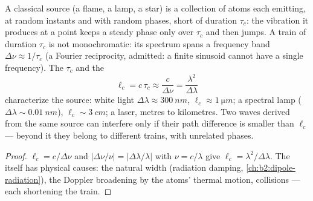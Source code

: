 \begin{proposition}\label{prop:b2:scalar-light-model:coherence}
A classical source (a flame, a lamp, a star) is a collection of atoms
each emitting, at random instants and with random phases, short
\emph{} of duration $\tau_c$: the vibration it produces at a
point keeps a steady phase only over $\tau_c$ and then jumps. A train of
duration $\tau_c$ is not monochromatic: its spectrum spans a frequency
band $\Delta\nu \approx 1/\tau_c$ (a Fourier reciprocity, admitted: a finite
sinusoid cannot have a single frequency). The \emph{}
$\tau_c$ and the \emph{}
\[
\ell_c = c\,\tau_c \approx \frac c{\Delta\nu} = \frac{\lambda^2}{\Delta\lambda}
\]
characterize the source: white light $\Delta\lambda \approx \qty{300}{nm}$, $\ell_c
\approx \qty{1}{\micro m}$; a spectral lamp ($\Delta\lambda \sim \qty{0.01}{nm}$), $\ell_c \sim
\qty{3}{cm}$; a laser, metres to kilometres. Two waves derived from the
same source can interfere only if their path difference is smaller
than $\ell_c$ --- beyond it they belong to different trains, with
unrelated phases.
\end{proposition}

\begin{proof}
$\ell_c = c/\Delta\nu$ and $|\Delta\nu/\nu| = |\Delta\lambda/\lambda|$ with $\nu = c/\lambda$ give $\ell_c =
\lambda^2/\Delta\lambda$. The  itself has physical causes: the
natural width (radiation damping, \cref{ch:b2:dipole-radiation}), the
Doppler broadening by the atoms' thermal motion, collisions --- each
shortening the train.
\end{proof}


